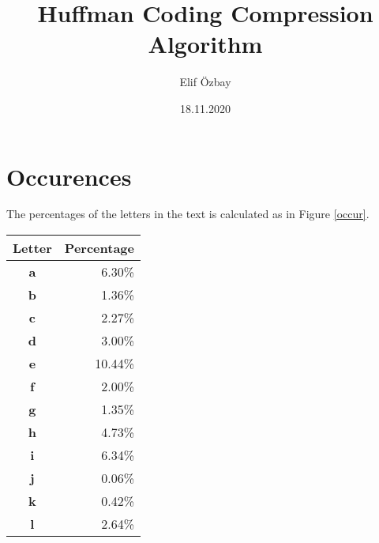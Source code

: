 \documentclass{article}
\author{Elif Özbay}
\title{Huffman Coding Compression Algorithm}
\date{18.11.2020}
\begin{document}
    \begin{titlepage}
        \maketitle
    \end{titlepage}

    \section{Occurences}
    The percentages of the letters in the text is calculated as in Figure \ref{occur}.
    \begin{table}[h]
        \centering
        \begin{tabular}{|c|r|}
            \hline
            \textbf{Letter}                         & \multicolumn{1}{c|}{\textbf{Percentage}} \\ \hline
            \textbf{a}                              & 6.30\%                                \\ \hline
            \textbf{b}                              & 1.36\%                                   \\ \hline
            \textbf{c}                              & 2.27\%                                    \\ \hline
            \textbf{d}                              & 3.00\%                                    \\ \hline
            \textbf{e}                              & 10.44\%                                      \\ \hline
            \textbf{f}                              & 2.00\%                                   \\ \hline
            \textbf{g}                              & 1.35\%                                   \\ \hline
            \textbf{h}                              & 4.73\%                                     \\ \hline
            \textbf{i}                              & 6.34\%                                     \\ \hline
            \textbf{j}                              & 0.06\%                              \\ \hline
            \textbf{k}                              & 0.42\%                                 \\ \hline
            \textbf{l}                              & 2.64\%                                    \\ \hline

\end{tabular}
\end{table}
\end{document}
